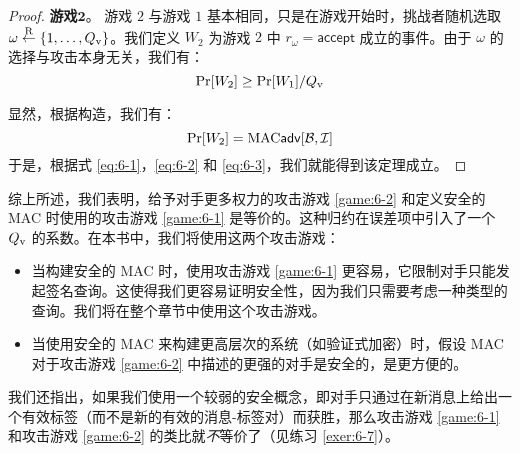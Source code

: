 \begin{proof}
\vspace{5pt}

\noindent\textbf{游戏$\mathbf{2}$}。
游戏 $2$ 与游戏 $1$ 基本相同，只是在游戏开始时，挑战者随机选取 $\omega\overset{\rm R}\leftarrow\{1,\dots,Q_{\rm v}\}$。我们定义 $W_2$ 为游戏 $2$ 中 $r_\omega=\mathsf{accept}$ 成立的事件。由于 $\omega$ 的选择与攻击本身无关，我们有：
\begin{equation}\label{eq:6-3}
\Pr[W_2]\geq{\Pr[W_1]}/{Q_{\rm v}}
\end{equation}

显然，根据构造，我们有：
\begin{equation}\label{eq:6-4}
\Pr[W_2]={\rm MAC}\mathsf{adv}[\mathcal{B},\mathcal{I}]
\end{equation}
于是，根据式 \ref{eq:6-1}，\ref{eq:6-2} 和 \ref{eq:6-3}，我们就能得到该定理成立。
\end{proof}

综上所述，我们表明，给予对手更多权力的攻击游戏 \ref{game:6-2} 和定义安全的 MAC 时使用的攻击游戏 \ref{game:6-1} 是等价的。这种归约在误差项中引入了一个 $Q_{\rm v}$ 的系数。在本书中，我们将使用这两个攻击游戏：
\begin{itemize}
	\item 当构建安全的 MAC 时，使用攻击游戏 \ref{game:6-1} 更容易，它限制对手只能发起签名查询。这使得我们更容易证明安全性，因为我们只需要考虑一种类型的查询。我们将在整个章节中使用这个攻击游戏。
	\item 当使用安全的 MAC 来构建更高层次的系统（如验证式加密）时，假设 MAC 对于攻击游戏 \ref{game:6-2} 中描述的更强的对手是安全的，是更方便的。
\end{itemize}

我们还指出，如果我们使用一个较弱的安全概念，即对手只通过在新消息上给出一个有效标签（而不是新的有效的消息-标签对）而获胜，那么攻击游戏 \ref{game:6-1} 和攻击游戏 \ref{game:6-2} 的类比就\emph{不}等价了（见练习 \ref{exer:6-7}）。